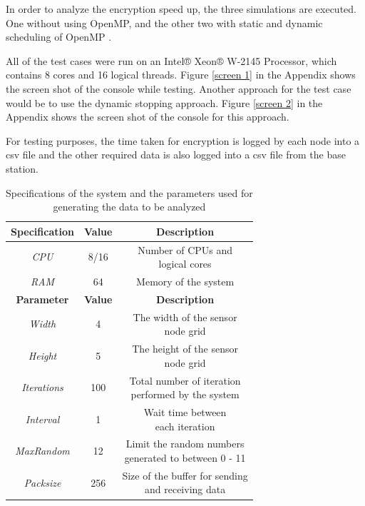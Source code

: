\documentclass[conference]{IEEEtran}
\begin{document}
	In order to analyze the encryption speed up, the three simulations are executed. One without using OpenMP, and the other two with static and dynamic scheduling of OpenMP \cite{jakas_corner_2016}.
	
	All of the test cases were run on an Intel® Xeon® W-2145 Processor, which contains 8 cores and 16 logical threads. Figure \ref{screen 1} in the Appendix shows the screen shot of the console while testing. Another approach for the test case would be to use the dynamic stopping approach. Figure \ref{screen 2} in the Appendix shows the screen shot of the console for this approach. 
	
	For testing purposes, the time taken for encryption is logged by each node into a csv file and the other required data is also logged into a csv file from the base station.
		
	\begin{table}[!h]\caption{Specifications of the system and the parameters used for generating the data to be analyzed}
		\begin{center}
			\renewcommand{\arraystretch}{1.2}
			\begin{tabular}{| c | c | c |} 
				\hline
				\textbf{Specification} & \textbf{Value} & \textbf{Description} \\ \hline
				\emph{CPU}    &  8/16   & \makecell{Number of CPUs and \\ logical cores }   \\ \hline
				\emph{RAM}    &  64   & \makecell{Memory of the system \\}   \\ \hline
				\textbf{Parameter} & \textbf{Value} & \textbf{Description} \\ \hline
				\emph{Width}    &  4   & \makecell{The width of the sensor \\ node grid }   \\ \hline
				\emph{Height}    &  5   & \makecell{The height of the sensor \\ node grid }   \\ \hline
				\emph{Iterations}    &  100   & \makecell{Total number of iteration \\ performed by the system }   \\ \hline
				\emph{Interval}    &  1   & \makecell{Wait time between \\ each iteration }   \\ \hline
				\emph{MaxRandom}    &  12   & \makecell{Limit the random numbers \\ generated to between 0 - 11}   \\ \hline
				\emph{Packsize}    &  256  & \makecell{Size of the buffer for sending\\ and receiving data }   \\ \hline
			\end{tabular}
			\label{params}
		\end{center}
	\end{table}
\end{document}
